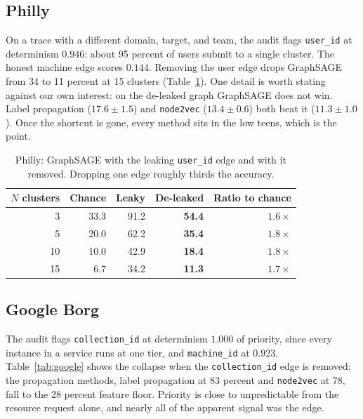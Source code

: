 \documentclass[11pt]{article}
\newcommand{\code}[1]{\texttt{#1}}
\begin{document}
\subsection{Philly}

On a trace with a different domain, target, and team, the audit flags
\code{user\_id} at determinism $0.946$: about 95 percent of users submit to a
single cluster. The honest machine edge scores $0.144$. Removing the user edge
drops GraphSAGE from 34 to 11 percent at 15 clusters (Table~\ref{tab:philly}).
One detail is worth stating against our own interest: on the de-leaked graph
GraphSAGE does not win. Label propagation ($17.6\pm1.5$) and \code{node2vec}
($13.4\pm0.6$) both beat it ($11.3\pm1.0$). Once the shortcut is gone, every
method sits in the low teens, which is the point.

\begin{table}[h]
\centering
\caption{Philly: GraphSAGE with the leaking \code{user\_id} edge and with it
removed. Dropping one edge roughly thirds the accuracy.}
\label{tab:philly}
\begin{tabular}{rrrrr}
\toprule
$N$ clusters & Chance & Leaky & \textbf{De-leaked} & Ratio to chance \\
\midrule
3  & 33.3 & 91.2 & \textbf{54.4} & $1.6\times$ \\
5  & 20.0 & 62.2 & \textbf{35.4} & $1.8\times$ \\
10 & 10.0 & 42.9 & \textbf{18.4} & $1.8\times$ \\
15 &  6.7 & 34.2 & \textbf{11.3} & $1.7\times$ \\
\bottomrule
\end{tabular}
\end{table}

\subsection{Google Borg}

The audit flags \code{collection\_id} at determinism $1.000$ of priority, since
every instance in a service runs at one tier, and \code{machine\_id} at
$0.923$. Table~\ref{tab:google} shows the collapse when the \code{collection\_id}
edge is removed: the propagation methods, label propagation at 83 percent and
\code{node2vec} at 78, fall to the 28 percent feature floor. Priority is close
to unpredictable from the resource request alone, and nearly all of the apparent
signal was the edge.
\end{document}
